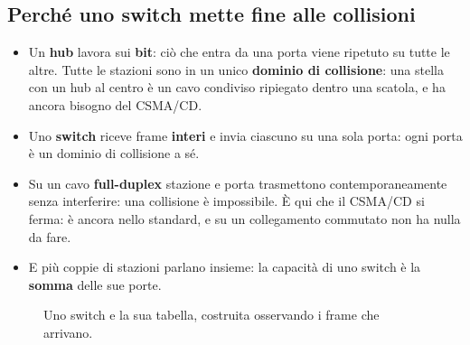 \subsection{Perché uno switch mette fine alle collisioni}

\begin{itemize}
    \item Un \textbf{hub} lavora sui \textbf{bit}: ciò che entra da una porta viene ripetuto su tutte le altre. Tutte le stazioni sono in un
          unico \textbf{dominio di collisione}: una stella con un hub al centro è un cavo condiviso ripiegato dentro una scatola, e ha
          ancora bisogno del CSMA/CD.
    \item Uno \textbf{switch} riceve frame \textbf{interi} e invia ciascuno su una sola porta: ogni porta è un dominio di collisione a sé.
    \item Su un cavo \textbf{full-duplex} stazione e porta trasmettono contemporaneamente senza interferire: una collisione è
          impossibile. È qui che il CSMA/CD si ferma: è ancora nello standard, e su un collegamento commutato non ha nulla da fare.
    \item E più coppie di stazioni parlano insieme: la capacità di uno switch è la \textbf{somma} delle sue porte.
\end{itemize}

\begin{figure}[H]
\centering
{}
\caption{Uno switch e la sua tabella, costruita osservando i frame che arrivano.}
\end{figure}


